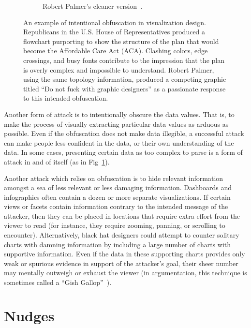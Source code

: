 \documentclass{vgtc}                          %
\begin{document}
\begin{figure}[!th]
\begin{subfigure}{0.9\columnwidth}
		\caption{Robert Palmer's cleaner version~\protect\cite{dontfuck}.}
	\end{subfigure}
	\caption{An example of intentional obfuscation in visualization design. Republicans in the U.S. House of Representatives produced a flowchart purporting to show the structure of the plan that would become the Affordable Care Act (ACA). Clashing colors, edge crossings, and busy fonts contribute to the impression that the plan is overly complex and impossible to understand. Robert Palmer, using the same topology information, produced a competing graphic titled ``Do not fuck with graphic designers'' as a passionate response to this intended obfuscation.}
	\label{fig:obfuscation}
\end{figure}

Another form of attack is to intentionally obscure the data values. That is, to make the process of visually extracting particular data values as arduous as possible. Even if the obfuscation does not make data illegible, a successful attack can make people less confident in the data, or their own understanding of the data. In some cases, presenting certain data as too complex to parse is a form of attack in and of itself (as in Fig~\ref{fig:obfuscation}).

Another attack which relies on obfuscation is to hide relevant information amongst a sea of less relevant or less damaging information. Dashboards and infographics often contain a dozen or more separate visualizations. If certain views or facets contain information contrary to the intended message of the attacker, then they can be placed in locations that require extra effort from the viewer to read (for instance, they require zooming, panning, or scrolling to encounter). Alternatively, black hat designers could attempt to counter solitary charts with damning information by including a large number of charts with supportive information. Even if the data in these supporting charts provides only weak or spurious evidence in support of the attacker's goal, their sheer number may mentally outweigh or exhaust the viewer (in argumentation, this technique is sometimes called a ``Gish Gallop''~\cite{gish}).

\section{Nudges}
\end{document}
